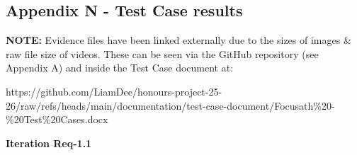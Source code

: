\documentclass[12pt]{article}
\begin{document}

\pagebreak
\subsection*{Appendix N - Test Case results}
\textbf{NOTE:} Evidence files have been linked externally due to the sizes of images \& raw file size of videos. These can be seen via
the GitHub repository (see Appendix A) and inside the Test Case document at:\newline

\noindent https://github.com/LiamDee/honours-project-25-26/raw/refs/heads/main/documentation/test-case-document/Focusath\%20-\%20Test\%20Cases.docx \newline

\noindent\textbf{Iteration Req-1.1}
\end{document}
